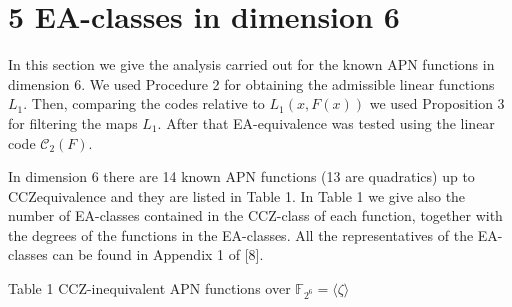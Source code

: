 \documentclass[10pt]{article}
\begin{document}
\section*{5 EA-classes in dimension 6}
In this section we give the analysis carried out for the known APN functions in dimension 6. We used Procedure 2 for obtaining the admissible linear functions $L_{1}$. Then, comparing the codes relative to $L_{1}(x, F(x))$ we used Proposition 3 for filtering the maps $L_{1}$. After that EA-equivalence was tested using the linear code $\mathscr{C}_{2}(F)$.

In dimension 6 there are 14 known APN functions (13 are quadratics) up to CCZequivalence and they are listed in Table 1. In Table 1 we give also the number of EA-classes contained in the CCZ-class of each function, together with the degrees of the functions in the EA-classes. All the representatives of the EA-classes can be found in Appendix 1 of [8].

Table 1 CCZ-inequivalent APN functions over $\mathbb{F}_{2^{6}}=\langle\zeta\rangle$
\end{document}
